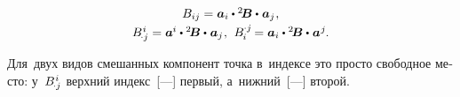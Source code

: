 \begin{otherlanguage}{russian}
\begin{equation}
\begin{array}{c}
B_{ij} = \bm{a}_i \dotp {^2\!\bm{B}} \dotp \hspace{0.1ex} \bm{a}_j \hspace{0.1ex}, \\[0.25em]
%
B_{\hspace{-0.2ex} \cdot j}^{\hspace{0.1ex}i} = \bm{a}^{\hspace{-0.05ex}i} \dotp {^2\!\bm{B}} \dotp \hspace{0.1ex} \bm{a}_j \hspace{0.1ex}, \:\,
B_{\hspace{-0.1ex}i}^{\hspace{-0.05ex} \cdot j} \hspace{-0.2ex} = \bm{a}_i \dotp {^2\!\bm{B}} \dotp \hspace{0.1ex} \bm{a}^{\hspace{0.1ex}j} \hspace{-0.1ex}.
\end{array}\end{equation}

\vspace{-0.1em}\noindent Для~двух видов смешанных компонент точка в~индексе это просто свободное место: у~${B_{\hspace{-0.2ex} \cdot j}^{\hspace{0.1ex}i}}$ верхний индекс~[---] первый, а~ниж\-ний~[---] второй.


\end{otherlanguage}
